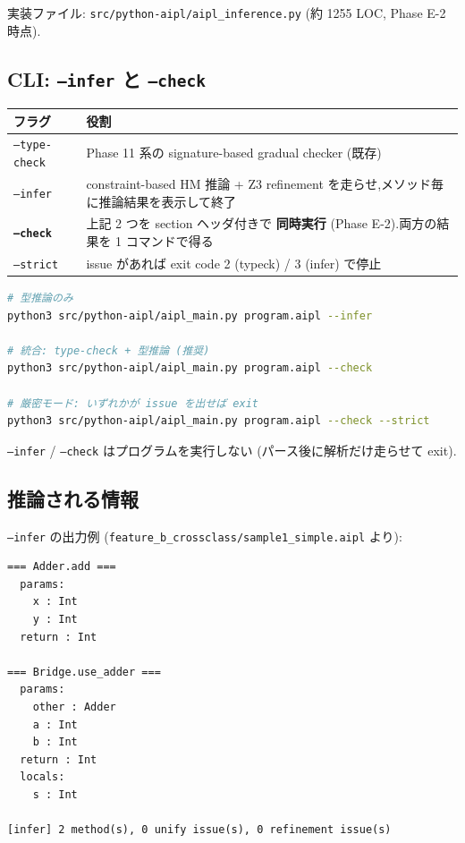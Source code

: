 \documentclass[11pt,a4paper]{article}
\begin{document}
実装ファイル: \texttt{src/python-aipl/aipl\_inference.py} (約 1255 LOC, Phase E-2 時点).

\subsection{CLI: \texttt{--infer} と \texttt{--check}}

\begin{center}
\begin{tabular}{p{4.5cm}p{9cm}}
\toprule
フラグ & 役割 \\
\midrule
\texttt{--type-check} & Phase 11 系の signature-based gradual checker (既存) \\
\texttt{--infer} & constraint-based HM 推論 + Z3 refinement を走らせ,メソッド毎に推論結果を表示して終了 \\
\textbf{\texttt{--check}} & 上記 2 つを section ヘッダ付きで \textbf{同時実行} (Phase E-2).両方の結果を 1 コマンドで得る \\
\texttt{--strict} & issue があれば exit code 2 (typeck) / 3 (infer) で停止 \\
\bottomrule
\end{tabular}
\end{center}

\begin{lstlisting}[language=bash]
# 型推論のみ
python3 src/python-aipl/aipl_main.py program.aipl --infer

# 統合: type-check + 型推論 (推奨)
python3 src/python-aipl/aipl_main.py program.aipl --check

# 厳密モード: いずれかが issue を出せば exit
python3 src/python-aipl/aipl_main.py program.aipl --check --strict
\end{lstlisting}

\texttt{--infer} / \texttt{--check} はプログラムを実行しない (パース後に解析だけ走らせて exit).

\subsection{推論される情報}

\texttt{--infer} の出力例 (\texttt{feature\_b\_crossclass/sample1\_simple.aipl} より):

\begin{lstlisting}
=== Adder.add ===
  params:
    x : Int
    y : Int
  return : Int

=== Bridge.use_adder ===
  params:
    other : Adder
    a : Int
    b : Int
  return : Int
  locals:
    s : Int

[infer] 2 method(s), 0 unify issue(s), 0 refinement issue(s)
\end{lstlisting}
\end{document}
